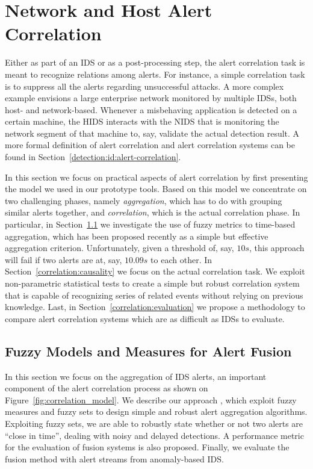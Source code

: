 \chapter{Network and Host Alert Correlation}
\label{correlation}
Either as part of an \ac{IDS} or as a post-processing step, the alert
correlation task is meant to recognize relations among alerts. For
instance, a simple correlation task is to suppress all the alerts
regarding unsuccessful attacks. A more complex example envisions a
large enterprise network monitored by multiple \acp{IDS}, both
host\hyp{} and network\hyp{}based. Whenever a misbehaving application
is detected on a certain machine, the \ac{HIDS} interacts with the
\ac{NIDS} that is monitoring the network segment of that machine to,
say, validate the actual detection result. A more formal definition of
alert correlation and alert correlation systems can be found in
Section~\ref{detection:id:alert-correlation}.

In this section we focus on practical aspects of alert correlation by
first presenting the model we used in our prototype tools. Based on
this model we concentrate on two challenging phases, namely
\emph{aggregation}, which has to do with grouping similar alerts
together, and \emph{correlation}, which is the actual correlation
phase. In particular, in Section~\ref{correlation:fusion} we
investigate the use of fuzzy metrics to time-based aggregation, which
has been proposed recently as a simple but effective aggregation
criterion. Unfortunately, given a threshold of, say, $10s$, this
approach will fail if two alerts are at, say, $10.09s$ to each
other. In Section~\ref{correlation:causality} we focus on the actual
correlation task. We exploit non\hyp{}parametric statistical tests to
create a simple but robust correlation system that is capable of
recognizing series of related events without relying on previous
knowledge. Last, in Section~\ref{correlation:evaluation} we propose a
methodology to compare alert correlation systems which are as
difficult as \acp{IDS} to evaluate.

\section{Fuzzy Models and Measures for Alert Fusion}
\label{correlation:fusion}
In this section we focus on the aggregation of \ac{IDS}
alerts, an important component of the alert correlation process as
shown on Figure~\ref{fig:correlation_model}. We describe our approach
\citep{2009_maggi_zanero_matteucci_fusion}, which exploit fuzzy
measures and fuzzy sets to design simple and robust alert aggregation
algorithms. Exploiting fuzzy sets, we are able to robustly state
whether or not two alerts are ``close in time'', dealing with noisy
and delayed detections. A performance metric for the evaluation of
fusion systems is also proposed. Finally, we evaluate the fusion
method with alert streams from anomaly-based \ac{IDS}.

